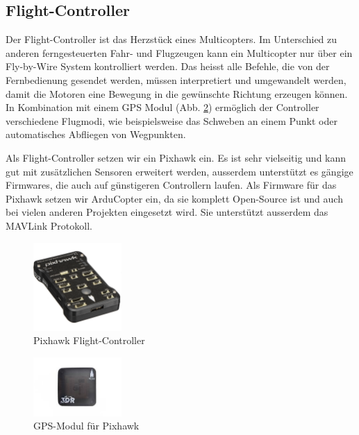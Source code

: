 \subsection{Flight-Controller}

Der Flight-Controller ist das Herzstück eines Multicopters. Im Unterschied zu anderen ferngesteuerten Fahr- und Flugzeugen kann ein Multicopter nur über ein Fly-by-Wire System kontrolliert werden. Das heisst alle Befehle, die von der Fernbedienung gesendet werden, müssen interpretiert und umgewandelt werden, damit die Motoren eine Bewegung in die gewünschte Richtung erzeugen können. In Kombination mit einem GPS Modul (Abb. \ref{fig:gps-module}) ermöglich der Controller verschiedene Flugmodi, wie beispielsweise das Schweben an einem Punkt oder automatisches Abfliegen von Wegpunkten.

Als Flight-Controller setzen wir ein Pixhawk ein. Es ist sehr vielseitig und kann gut mit zusätzlichen Sensoren erweitert werden, ausserdem unterstützt es gängige Firmwares, die auch auf günstigeren Controllern laufen. Als Firmware für das Pixhawk setzen wir ArduCopter ein, da sie komplett Open-Source ist und auch bei vielen anderen Projekten eingesetzt wird. Sie unterstützt ausserdem das \Gls{MAVLink} Protokoll.

\begin{figure}[h]
\centering
\includegraphics[width=0.3\textwidth] {images/hardware/pixhawk.jpg} 
\caption{Pixhawk Flight-Controller}
\label{fig:pixhawk}
\end{figure}

\begin{figure}[h]
\centering
\includegraphics[width=0.3\textwidth] {images/hardware/gps-module.jpg} 
\caption{GPS-Modul für Pixhawk}
\label{fig:gps-module}
\end{figure}

